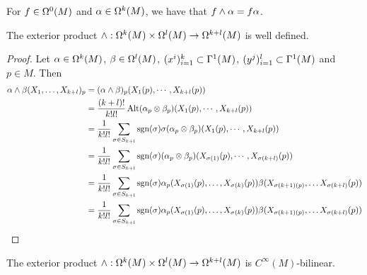 \documentclass{book}
\begin{document}
	\begin{note}
		For $f \in \Omega^0(M)$ and $\alpha \in \Omega^k(M)$, we have that $f \wedge \alpha = f \alpha$.
	\end{note}
	
	\begin{ex}
	The exterior product $\wedge: \Omega^k(M) \times \Omega^l(M) \rightarrow \Omega^{k+l}(M) $ is well defined.
	\end{ex}
	
	\begin{proof}
	Let $\alpha \in \Omega^k(M)$, $\beta \in \Omega^l(M)$, $(x^i)_{i=1}^k \subset \Gamma^1(M)$, $(y^j)_{i=1}^l \subset \Gamma^1(M)$ and $p \in M$. Then 
	\begin{align*}
	\alpha \wedge \beta (X_1, \dots, X_{k+l})_p
	&= (\alpha \wedge \beta)_p ({X_1}(p), \cdots, {X_{k+l}}(p)) \\
	&= \frac{(k+l)!}{k! l!} \operatorname{Alt}(\alpha_p \otimes \beta_p)({X_1}(p), \cdots, {X_{k+l}}(p)) \\
	&= \frac{1}{k! l!} \sum_{\sigma \in S_{k+l}} \operatorname{sgn}(\sigma)\sigma (\alpha_p \otimes \beta_p) ({X_1}(p), \cdots, {X_{k+l}}(p)) \\
	&= \frac{1}{k! l!} \sum_{\sigma \in S_{k+l}} \operatorname{sgn}(\sigma)(\alpha_p \otimes \beta_p) (X_{\sigma(1)}(p), \cdots, X_{\sigma(k+l)}(p)) \\
	&= \frac{1}{k! l!} \sum_{\sigma \in S_{k+l}} \operatorname{sgn}(\sigma) \alpha_p(X_{\sigma(1)}(p), \dots,X_{\sigma(k)}(p)) \beta(X_{\sigma(k+1)(p)}, \dots X_{\sigma(k+l)}(p)) \\
	&= \frac{1}{k! l!} \sum_{\sigma \in S_{k+l}} \operatorname{sgn}(\sigma) \alpha_p(X_{\sigma(1)}(p), \dots,X_{\sigma(k)}(p)) \beta(X_{\sigma(k+1)(p)}, \dots X_{\sigma(k+l)}(p)) \\
	\end{align*}	 
	\end{proof}
	
	\begin{ex}
	The exterior product $\wedge: \Omega^k(M) \times \Omega^l(M) \rightarrow \Omega^{k+l}(M) $ is $C^{\infty}(M)$-bilinear.
	\end{ex}
	
\end{document}
